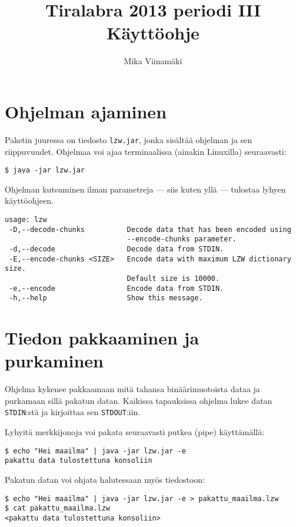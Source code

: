 \documentclass{article}
\begin{document}
\title{Tiralabra 2013 periodi III \\ Käyttöohje}
\author{Mika Viinamäki}
\maketitle

\section{Ohjelman ajaminen}

Paketin juuressa on tiedosto \verb+lzw.jar+, jonka sisältää ohjelman ja sen riippuvuudet. Ohjelmaa voi ajaa terminaalissa (ainakin Linuxilla) seuraavasti:

\begin{verbatim}
$ java -jar lzw.jar
\end{verbatim}

Ohjelman kutsuminen ilman parametreja --- siis kuten yllä --- tulostaa lyhyen käyttöohjeen.

\begin{verbatim}
usage: lzw
 -D,--decode-chunks          Decode data that has been encoded using
                             --encode-chunks parameter.
 -d,--decode                 Decode data from STDIN.
 -E,--encode-chunks <SIZE>   Encode data with maximum LZW dictionary size.
                             Default size is 10000.
 -e,--encode                 Encode data from STDIN.
 -h,--help                   Show this message.
\end{verbatim}

\section{Tiedon pakkaaminen ja purkaminen}
Ohjelma kykenee pakkaamaan mitä tahansa binäärimuotoista dataa ja purkamaan sillä pakatun datan. Kaikissa tapauksissa ohjelma lukee datan \verb+STDIN+:stä ja kirjoittaa sen \verb+STDOUT+:iin.

Lyhyitä merkkijonoja voi pakata seuraavasti putkea (pipe) käyttämällä:
\begin{verbatim}
$ echo "Hei maailma" | java -jar lzw.jar -e
pakattu data tulostettuna konsoliin
\end{verbatim}

\begin{samepage}
Pakatun datan voi ohjata halutessaan myös tiedostoon:
\begin{verbatim}
$ echo "Hei maailma" | java -jar lzw.jar -e > pakattu_maailma.lzw
$ cat pakattu_maailma.lzw
<pakattu data tulostettuna konsoliin>
\end{verbatim}
\end{samepage}
\end{document}
